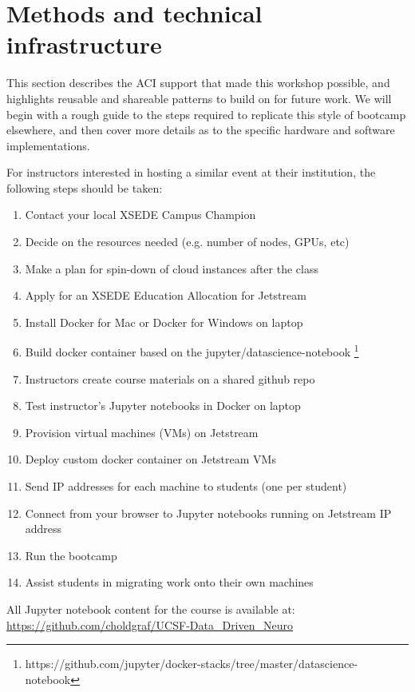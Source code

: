 \section{Methods and technical infrastructure}\label{sec:methods}

This section describes the ACI support that made this workshop possible, and
highlights reusable and shareable patterns to build on for future work. We will
begin with a rough guide to the steps required to replicate this style of
bootcamp elsewhere, and then cover more details as to the specific hardware and
software implementations.

For instructors interested in hosting a similar event at their institution, the
following steps should be taken:

\begin{enumerate}
\item Contact your local XSEDE Campus Champion
\item Decide on the resources needed (e.g. number of nodes, GPUs, etc)
\item Make a plan for spin-down of cloud instances after the class
\item Apply for an XSEDE Education Allocation for Jetstream
\item Install Docker for Mac or Docker for Windows on laptop
\item Build docker container based on the jupyter/datascience-notebook \footnote{https://github.com/jupyter/docker-stacks/tree/master/datascience-notebook}
\item Instructors create course materials on a shared github repo
\item Test instructor's Jupyter notebooks in Docker on laptop
\item Provision virtual machines (VMs) on Jetstream
\item Deploy custom docker container on Jetstream VMs
\item Send IP addresses for each machine to students (one per student)
\item Connect from your browser to Jupyter notebooks running on Jetstream IP address
\item Run the bootcamp
\item Assist students in migrating work onto their own machines
\end{enumerate}

All Jupyter notebook content for the course is available at:\\
\indent\indent\url{https://github.com/choldgraf/UCSF-Data_Driven_Neuro}

